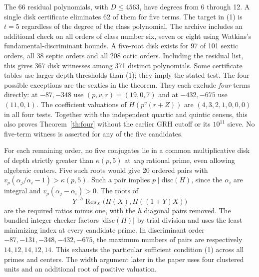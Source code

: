 The $66$ residual polynomials, with $D\le4563$, have degrees from 6 through 12. A single disk certificate eliminates 62 of them for five terms. The target in (1) is $t=5$ regardless of the degree of the class polynomial. The archive includes an additional check on all orders of class number six, seven or eight using Watkins's fundamental-discriminant bounds. A five-root disk exists for 97 of 101 sextic orders, all 38 septic orders and all 208 octic orders. Including the residual list, this gives 367 disk witnesses among 371 distinct polynomials. Some certificate tables use larger depth thresholds than (1); they imply the stated test. The four possible exceptions are the sextics in the theorem. They each exclude \emph{four} terms directly: at $-87,-348$ use $(p,v,r)=(19,0,7)$ and at $-432,-675$ use $(11,0,1)$. The coefficient valuations of $H(p^v(r+Z))$ are $(4,3,2,1,0,0,0)$ in all four tests. Together with the independent quartic and quintic census, this also proves Theorem~\ref{th:four} without the earlier GRH cutoff or its $10^{11}$ sieve. No five-term witness is asserted for any of the five candidates.

For each remaining order, no five conjugates lie in a common multiplicative disk of depth strictly greater than $\kappa(p,5)$ at \emph{any} rational prime, even allowing algebraic centers. Five such roots would give 20 ordered pairs with $v_p(\alpha_j/\alpha_i-1)>\kappa(p,5)$. Such a pair implies $p\mid\mathrm{disc}(H)$, since the $\alpha_i$ are integral and $v_p(\alpha_j-\alpha_i)>0$. The roots of
\[
   Y^{-h}\operatorname{Res}_X\!\big(H(X),H((1+Y)X)\big)
\]
are the required ratios minus one, with the $h$ diagonal pairs removed. The bundled integer checker factors $|\mathrm{disc}(H)|$ by trial division and uses the least minimizing index at every candidate prime. In discriminant order $-87,-131,-348,-432,-675$, the maximum numbers of pairs are respectively $14,12,14,12,14$. This exhausts the particular sufficient condition (1) across all primes and centers. The width argument later in the paper uses four clustered units and an additional root of positive valuation.
